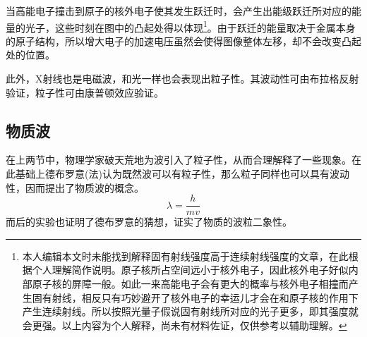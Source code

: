 当高能电子撞击到原子的核外电子使其发生跃迁时，会产生出能级跃迁所对应的能量的光子，这些时刻在图中的凸起处得以体现\footnote{本人编辑本文时未能找到解释固有射线强度高于连续射线强度的文章，在此根据个人理解简作说明。原子核所占空间远小于核外电子，因此核外电子好似内部原子核的屏障一般。如此一来高能电子会有更大的概率与核外电子相撞而产生固有射线，相反只有巧妙避开了核外电子的幸运儿才会在和原子核的作用下产生连续射线。所以按照光量子假说固有射线所对应的光子更多，即其强度就会更强。以上内容为个人解释，尚未有材料佐证，仅供参考以辅助理解。}。由于跃迁的能量取决于金属本身的原子结构，所以增大电子的加速电压虽然会使得图像整体左移，却不会改变凸起处的位置。

此外，X射线也是电磁波，和光一样也会表现出粒子性。其波动性可由布拉格反射验证，粒子性可由康普顿效应验证。

\subsection{物质波}

在上两节中，物理学家破天荒地为波引入了粒子性，从而合理解释了一些现象。在此基础上德布罗意(法)认为既然波可以有粒子性，那么粒子同样也可以具有波动性，因而提出了物质波的概念。
\begin{equation*}
    \lambda=\frac{h}{mv}
\end{equation*}
而后的实验也证明了德布罗意的猜想，证实了物质的波粒二象性。
